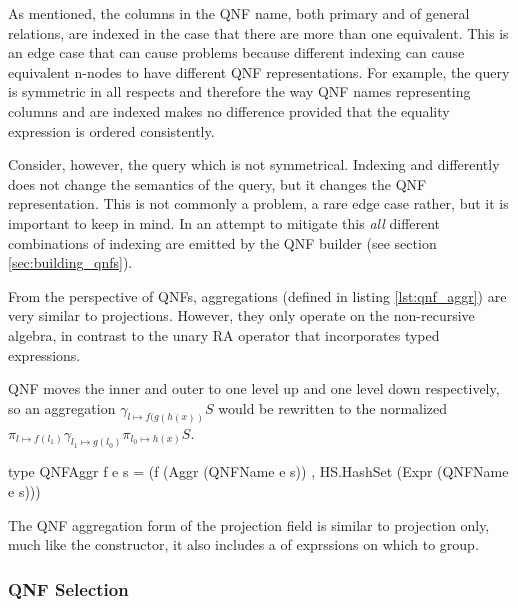 As mentioned, the columns in the QNF name, both primary and of general
relations, are indexed in the case that there are more than one
equivalent. This is an edge case that can cause problems because
different indexing can cause equivalent n-nodes to have different QNF
representations. For example, the query  is symmetric in all respects and therefore
the way QNF names representing columns  and  are
indexed makes no difference provided that the equality expression
 is ordered consistently.


Consider, however, the query  which is not symmetrical. Indexing  and
 differently does not change the semantics of the query, but
it changes the QNF representation. This is not commonly a problem, a
rare edge case rather, but it is important to keep in mind.  In an
attempt to mitigate this \emph{all} different combinations of indexing
are emitted by the QNF builder (see section \ref{sec:building_qnfs}).

From the perspective of QNFs, aggregations (defined in listing
\ref{lst:qnf_aggr}) are very similar to projections. However, they
only operate on the non-recursive  algebra, in contrast to
the  unary RA operator that incorporates  typed expressions.

QNF moves the inner and outer  to one level up and one
level down respectively, so an aggregation \(\gamma_{l \mapsto
f(g(h(x))} S\) would be rewritten to the normalized \(\pi_{l \mapsto
f(l_1)} \gamma_{l_1 \mapsto g(l_0)} \pi_{l_0 \mapsto h(x)} S\).

\begin{code}
  \begin{haskellcode}
    type QNFAggr f e s =
      (f (Aggr (QNFName e s))
      , HS.HashSet (Expr (QNFName e s)))
  \end{haskellcode}
  \caption{\label{lst:qnf_aggr} The QNF aggregation form of the
    projection field is similar to projection only, much like the
     constructor, it also includes a  of
    exprssions on which to group.}
\end{code}

\subsubsection{QNF Selection}

